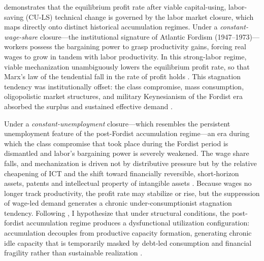 \citet{Basu2026} demonstrates that the equilibrium profit
rate after viable capital-using, labor-saving (CU-LS)
technical change is governed by the labor market closure,
which maps directly onto distinct historical accumulation
regimes. Under a \textit{constant-wage-share} closure---the
institutional signature of Atlantic Fordism
(1947--1973)---workers possess the bargaining power to grasp
productivity gains, forcing real wages to grow in tandem with
labor productivity. In this strong-labor regime, viable
mechanization unambiguously lowers the equilibrium profit
rate, so that Marx's law of the tendential fall in the rate
of profit holds \citep{Basu2026}. This stagnation tendency
was institutionally offset: the class compromise, mass
consumption, oligopolistic market structures, and military
Keynesianism of the Fordist era absorbed the surplus and
sustained effective demand \citep{Vidal2019}.

Under a \textit{constant-unemployment} closure---which resembles the persistent unemployment feature of the post-Fordist accumulation regime---an era during which the class compromise that took place during the Fordist period is dismantled and labor's
bargaining power is severely weakened. The wage share falls,
and mechanization is driven not by distributive pressure but
by the relative cheapening of ICT and the shift toward
financially reversible, short-horizon assets, patents and intellectual property of intangible assets 
\citep{Lapavitsas2011, Pagano2014}. Because wages no longer
track productivity, the profit rate may stabilize or rise,
but the suppression of wage-led demand generates a chronic
under-consumptionist stagnation tendency. Following \citet{Vidal2019}, I hypothesize that under structural conditions, the post-fordist accumulation regime produces a dysfunctional utilization configuration:
accumulation decouples from productive capacity formation,
generating chronic idle capacity that is temporarily masked
by debt-led consumption and financial fragility rather than
sustainable realization \citep{Stockhammer2012, Vidal2019}.

